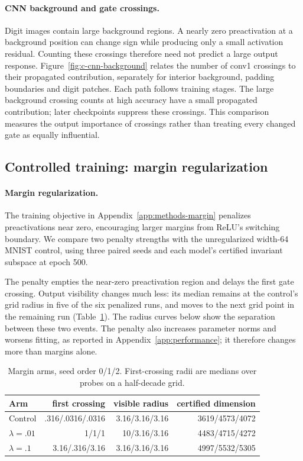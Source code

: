 \paragraph{CNN background and gate crossings.}
Digit images contain large background regions. A nearly zero preactivation at a background position can change sign while producing only a small activation residual. Counting these crossings therefore need not predict a large output response. Figure~\ref{fig:c-cnn-background} relates the number of conv1 crossings to their propagated contribution, separately for interior background, padding boundaries and digit patches. Each path follows training stages. The large background crossing counts at high accuracy have a small propagated contribution; later checkpoints suppress these crossings. This comparison measures the output importance of crossings rather than treating every changed gate as equally influential.



\subsection{Controlled training: margin regularization}
\label{app:controlled}


\paragraph{Margin regularization.}
The training objective in Appendix~\ref{app:methods-margin} penalizes preactivations near zero, encouraging larger margins from ReLU's switching boundary. We compare two penalty strengths with the unregularized width-64 MNIST control, using three paired seeds and each model's certified invariant subspace at epoch 500.

The penalty empties the near-zero preactivation region and delays the first gate crossing. Output visibility changes much less: its median remains at the control's grid radius in five of the six penalized runs, and moves to the next grid point in the remaining run (Table~\ref{tab:margin-summary}). The radius curves below show the separation between these two events. The penalty also increases parameter norms and worsens fitting, as reported in Appendix~\ref{app:performance}; it therefore changes more than margins alone.
\begin{table}[!htbp]\centering
\caption{Margin arms, seed order 0/1/2. First-crossing radii are medians over probes on a half-decade grid.}\label{tab:margin-summary}
\begin{tabular}{lrrr}\toprule
Arm & first crossing & visible radius & certified dimension\\\midrule
Control & .316/.0316/.0316 &3.16/3.16/3.16&3619/4573/4072\\
$\lambda=.01$ &1/1/1&10/3.16/3.16&4483/4715/4272\\
$\lambda=.1$ &3.16/.316/3.16&3.16/3.16/3.16&4997/5532/5305\\\bottomrule
\end{tabular}\end{table}

